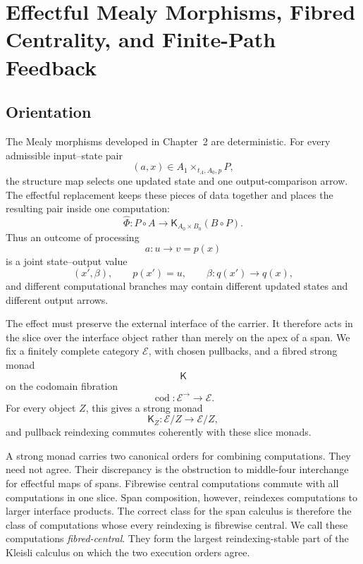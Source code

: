 \chapter[Effectful Mealy Morphisms and Finite-Path Feedback]
{Effectful Mealy Morphisms, Fibred Centrality, and Finite-Path Feedback}
\label{chap:effectful-mealy-centrality-feedback}

\section{Orientation}
\label{sec:effectful-orientation}

The Mealy morphisms developed in Chapter~2 are deterministic.  For every
admissible input--state pair
\[
    (a,x)\in A_1\times_{t_A,A_0,p}P,
\]
the structure map selects one updated state and one output-comparison arrow.
The effectful replacement keeps these pieces of data together and places the
resulting pair inside one computation:
\[
    \widehat\Phi:
    P\circ A
    \longrightarrow
    \mathsf K_{A_0\times B_0}(B\circ P).
\]
Thus an outcome of processing
\[
    a:u\to v=p(x)
\]
is a joint state--output value
\[
    (x',\beta),
    \qquad
    p(x')=u,
    \qquad
    \beta:q(x')\to q(x),
\]
and different computational branches may contain different updated states and
different output arrows.

The effect must preserve the external interface of the carrier.  It therefore
acts in the slice over the interface object rather than merely on the apex of
a span.  We fix a finitely complete category \(\mathcal E\), with chosen
pullbacks, and a fibred strong monad
\[
    \mathsf K
\]
on the codomain fibration
\[
    \operatorname{cod}:\mathcal E^{\to}\longrightarrow\mathcal E.
\]
For every object \(Z\), this gives a strong monad
\[
    \mathsf K_Z:
    \mathcal E/Z\longrightarrow\mathcal E/Z,
\]
and pullback reindexing commutes coherently with these slice monads.

A strong monad carries two canonical orders for combining computations.  They
need not agree.  Their discrepancy is the obstruction to middle-four
interchange for effectful maps of spans.  Fibrewise central computations
commute with all computations in one slice.  Span composition, however,
reindexes computations to larger interface products.  The correct class for
the span calculus is therefore the class of computations whose every
reindexing is fibrewise central.  We call these computations
\emph{fibred-central}.  They form the largest reindexing-stable part of the
Kleisli calculus on which the two execution orders agree.

